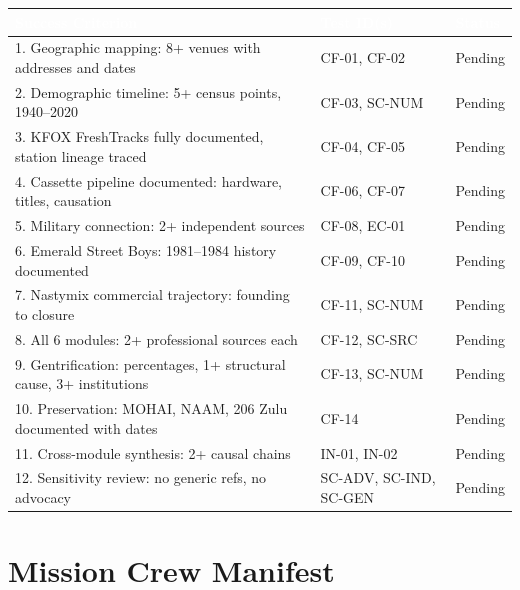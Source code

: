 \documentclass[11pt,letterpaper]{article}
\newcommand{\tableheader}[1]{\textbf{\sffamily\textcolor{white}{#1}}}
\begin{document}
\begin{center}
\begin{tabularx}{\textwidth}{XL{3.5cm}C{1.5cm}}
\toprule
{}
\tableheader{Success Criterion} & \tableheader{Test ID(s)} & \tableheader{Status} \\
. Geographic mapping: 8+ venues with addresses and dates & CF-01, CF-02 & Pending \\
2. Demographic timeline: 5+ census points, 1940--2020 & CF-03, SC-NUM & Pending \\
3. KFOX FreshTracks fully documented, station lineage traced & CF-04, CF-05 & Pending \\
4. Cassette pipeline documented: hardware, titles, causation & CF-06, CF-07 & Pending \\
5. Military connection: 2+ independent sources & CF-08, EC-01 & Pending \\
6. Emerald Street Boys: 1981--1984 history documented & CF-09, CF-10 & Pending \\
7. Nastymix commercial trajectory: founding to closure & CF-11, SC-NUM & Pending \\
8. All 6 modules: 2+ professional sources each & CF-12, SC-SRC & Pending \\
9. Gentrification: percentages, 1+ structural cause, 3+ institutions & CF-13, SC-NUM & Pending \\
10. Preservation: MOHAI, NAAM, 206 Zulu documented with dates & CF-14 & Pending \\
11. Cross-module synthesis: 2+ causal chains & IN-01, IN-02 & Pending \\
12. Sensitivity review: no generic refs, no advocacy & SC-ADV, SC-IND, SC-GEN & Pending \\
\bottomrule
\end{tabularx}
\end{center}

\section{Mission Crew Manifest}
\end{document}
